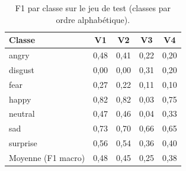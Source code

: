 \begin{table}[H]
\centering
\small
\caption{F1 par classe sur le jeu de test (classes par ordre alphabétique).}
\label{tab:perclass}
\begin{tabular}{lcccc}
\toprule
Classe & V1 & V2 & V3 & V4 \\
\midrule
angry & 0,48 & 0,41 & 0,22 & 0,20 \\
disgust & 0,00 & 0,00 & 0,31 & 0,20 \\
fear & 0,27 & 0,22 & 0,11 & 0,10 \\
happy & 0,82 & 0,82 & 0,03 & 0,75 \\
neutral & 0,47 & 0,46 & 0,04 & 0,33 \\
sad & 0,73 & 0,70 & 0,66 & 0,65 \\
surprise & 0,56 & 0,54 & 0,36 & 0,40 \\
\midrule
Moyenne (F1 macro) & 0,48 & 0,45 & 0,25 & 0,38 \\
\bottomrule
\end{tabular}
\end{table}
